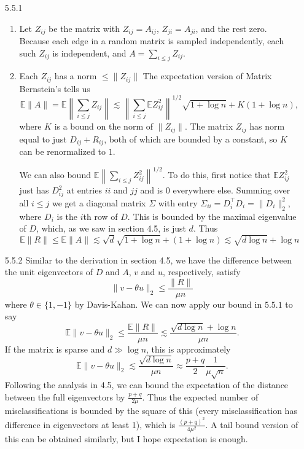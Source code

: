 \documentclass[11pt]{article}
\def\E{\mathbb E}
\begin{document}
\begin{enumerate}
\item[5.5.1] \begin{enumerate}
	\item Let $ Z_{ij} $ be the matrix with $ Z_{ij}=A_{ij} $, $ Z_{ji}=A_{ji} $, and the rest zero. Because each edge in a random matrix is sampled independently, each such $ Z_{ij} $ is independent, and $ A = \sum_{i\leq j} Z_{ij} $.
	\item Each $ Z_{ij} $ has a norm $ \leq\| Z_{ij} \| $
	The expectation version of Matrix Bernstein's tells us 
	\[ \E \| A \| = \E \left\| \sum_{i\leq j} Z_{ij} \right\| \lesssim \left\| \sum_{i\leq j} \E Z_{ij}^2 \right\|^{1/2} \sqrt{1+\log n} + K(1 + \log n), \]
	where $ K $ is a bound on the norm of $ \|Z_{ij}\| $. The matrix $ Z_{ij} $ has norm equal to just $ D_{ij} + R_{ij} $, both of which are bounded by a constant, so $ K $ can be renormalized to $ 1 $. 
	
	We can also bound $ \E \left\| \sum_{i\leq j} Z_{ij}^2 \right\|^{1/2} $. To do this, first notice that $ \E Z_{ij}^2 $ just has $ D_{ij}^2 $ at entries $ ii $ and $ jj $ and is $ 0 $ everywhere else. Summing over all $ i\leq j $ we get a diagonal matrix $ \Sigma $ with entry $ \Sigma_{ii} = D_i^\top D_i = \| D_i \|_2^2 $, where $ D_i $ is the $ i $th row of $ D $. This is bounded by the maximal eigenvalue of $ D $, which, as we saw in section 4.5, is just $ d $. Thus
	\[ \E \|R\| \leq \E \|A\| \lesssim \sqrt{d} \sqrt{1+\log n} + (1 + \log n) \lesssim \sqrt{d\log n} + \log n \]
\end{enumerate}

\item[5.5.2] Similar to the derivation in section 4.5, we have the difference between the unit eigenvectors of $ D $ and $ A $, $ v $ and $ u $, respectively, satisfy
\[ \|v - \theta u\|_2 \leq \frac{\|R\|}{\mu n} \]
where $ \theta\in \{1,-1\} $ by Davis-Kahan. We can now apply our bound in $ 5.5.1 $ to say
\[ \E\|v-\theta u\|_2 \leq \frac{\E \| R \|}{\mu n} \lesssim \frac{\sqrt{d\log n} + \log n}{\mu n}. \]
If the matrix is sparse and $ d\gg \log n $, this is approximately
\[ \E\|v-\theta u\|_2 \lesssim \frac{\sqrt{d\log n}}{\mu n} \approx \frac{p+q}{2}\frac{1}{\mu \sqrt{n}}. \]
Following the analysis in 4.5, we can bound the expectation of the distance between the full eigenvectors by $ \frac{p+q}{2\mu} $. Thus the expected number of misclassifications is bounded by the square of this (every misclassification has difference in eigenvectors at least 1), which is $ \frac{(p+q)^2}{4\mu^2} $. A tail bound version of this can be obtained similarly, but I hope expectation is enough.

	\end{enumerate}
	
\end{document}
